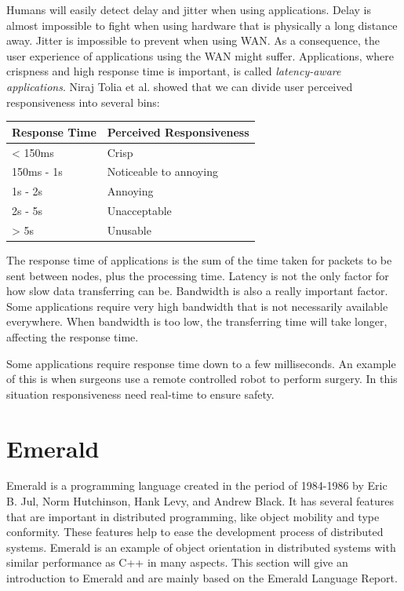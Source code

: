 Humans will easily detect delay and jitter when using applications\cite{satyanarayanan_case_2009}. Delay is almost impossible to fight when using hardware that is physically a long distance away. Jitter is impossible to prevent when using WAN. As a consequence, the user experience of applications using the WAN might suffer. Applications, where crispness and high response time is important, is called \textit{latency-aware applications}. Niraj Tolia et al.\cite{tolia_quantifying_2006} showed that we can divide user perceived responsiveness into several bins:
\begin{center}
\begin{tabular}{ | p{3cm} | p{5cm} | } 
    \hline
    Response Time& Perceived Responsiveness  \\ 
    \hline
    < 150ms & Crisp  \\ 
    150ms - 1s & Noticeable to annoying \\ 
    1s - 2s & Annoying \\ 
    2s - 5s & Unacceptable \\ 
    > 5s & Unusable \\ 
    \hline
\end{tabular}
\end{center}
The response time of applications is the sum of the time taken for packets to be sent between nodes, plus the processing time. Latency is not the only factor for how slow data transferring can be. Bandwidth is also a really important factor\cite{cerqueira_interactive_2007}. Some applications require very high bandwidth that is not necessarily available everywhere. When bandwidth is too low, the transferring time will take longer, affecting the response time.

Some applications require response time down to a few milliseconds. An example of this is when surgeons use a remote controlled robot to perform surgery. In this situation responsiveness need real-time to ensure safety. 








\section{Emerald}\label{Emerald}
Emerald is a programming language created in the period of 1984-1986 by Eric B. Jul, Norm Hutchinson, Hank Levy, and Andrew Black. It has several features that are important in distributed programming, like object mobility and type conformity. These features help to ease the development process of distributed systems. Emerald is an example of object orientation in distributed systems with similar performance as C++ in many aspects. This section will give an introduction to Emerald and are mainly based on the Emerald Language Report\cite{hutchinson_emerald_nodate}.

